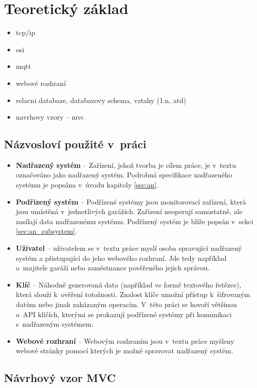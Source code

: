 \chapter{Teoretický základ}
\label{sec:te}
\begin{itemize}
    \item tcp/ip
    \item osi
    \item mqtt
    \item webové rozhraní
    \item relacni databaze, databazovy schema, vztahy (1:n, atd)
    \item navrhovy vzory -- mvc
\end{itemize}

\section{Názvosloví použité v~práci}

\begin{itemize}
    \item \textbf{Nadřazený systém} -- Zařízení, jehož tvorba je cílem práce, je v~textu označováno jako nadřazený systém. Podrobná specifikace nadřazeného systému je popsána v~úvodu kapitoly \ref{sec:an}.
    \item \textbf{Podřizený systém} -- Podřízené systémy jsou monitorovací zařízení, která jsou umístěná v~jednotlivých garážích. Zařízení neoperují samostatně, ale zasílají data nadřazenému systému. Podřízený systém je blíže popsán v~sekci \ref{sec:an_subsystem}.
    \item \textbf{Uživatel} -- uživatelem se v~textu práce myslí osoba spravující nadřazený systém a přistupující do jeho webového rozhraní. Jde tedy například o~majitele garáží nebo zaměstnance pověřeného jejich správou.
    \item \textbf{Klíč} -- Náhodně generovaná data (například ve formě textového řetězce), která slouží k~ověření totožnosti. Znalost klíče umožní přístup k~šifrovaným datům nebo jinak zakázaným operacím. V~této práci se hovoří většinou o~API klíčích, kterými se prokazují podřízené systémy při komunikaci s~nadřazeným systémem.
    \item \textbf{Webové rozhraní} -- Webovým rozhraním jsou v~textu práce myšleny webové stránky pomocí kterých je možné spravovat nadřazený systém.
\end{itemize}

\section{Návrhový vzor MVC}


